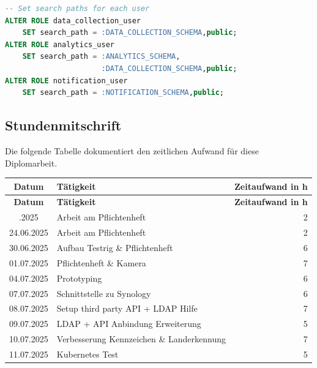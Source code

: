 \begin{lstlisting}[language=SQL, caption={Datenbank-Initialisierungsskript (init.sql)}, label={lst:init_sql}]
-- Set search paths for each user
ALTER ROLE data_collection_user 
    SET search_path = :DATA_COLLECTION_SCHEMA,public;
ALTER ROLE analytics_user 
    SET search_path = :ANALYTICS_SCHEMA,
                      :DATA_COLLECTION_SCHEMA,public;
ALTER ROLE notification_user 
    SET search_path = :NOTIFICATION_SCHEMA,public;
\end{lstlisting}

\newpage
\subsection{Stundenmitschrift}

Die folgende Tabelle dokumentiert den zeitlichen Aufwand für diese Diplomarbeit.

\begin{longtable}{|c|l|r|}
    \hline
    \textbf{Datum}  & \textbf{Tätigkeit}                             & \textbf{Zeitaufwand in h} \\
    \hline
    \endfirsthead
    \hline
    \textbf{Datum}  & \textbf{Tätigkeit}                             & \textbf{Zeitaufwand in h} \\
    \hline
    \endhead
    \hline
    \endfoot
    17.06.2025      & Arbeit am Pflichtenheft                        & 2                         \\
    24.06.2025      & Arbeit am Pflichtenheft                        & 2                         \\
    30.06.2025      & Aufbau Testrig \& Pflichtenheft                & 6                         \\
    01.07.2025      & Pflichtenheft \& Kamera                        & 7                         \\
    04.07.2025      & Prototyping                                    & 6                         \\
    07.07.2025      & Schnittstelle zu Synology                      & 6                         \\
    08.07.2025      & Setup third party API + LDAP Hilfe             & 7                         \\
    09.07.2025      & LDAP + API Anbindung Erweiterung               & 5                         \\
    10.07.2025      & Verbesserung Kennzeichen \& Landerkennung      & 7                         \\
    11.07.2025      & Kubernetes Test                                & 5                         \\

\end{longtable}
